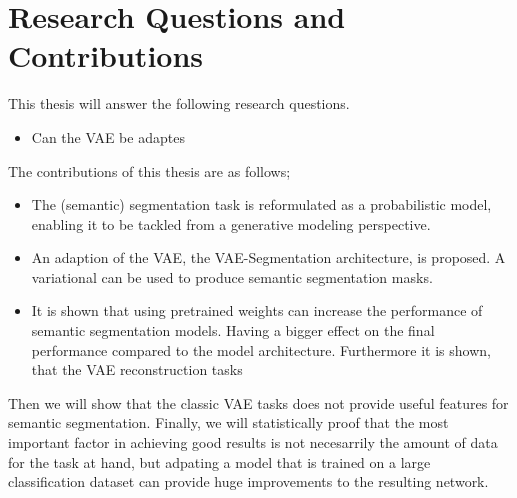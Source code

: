 \section{Research Questions and Contributions}
This thesis will answer the following research questions.
\begin{itemize}
    \item Can the VAE be adaptes
\end{itemize}
The contributions of this thesis are as follows;
\begin{itemize}
    \item The (semantic) segmentation task is reformulated as a probabilistic model, enabling it to be tackled from a generative modeling perspective.
    \item An adaption of the VAE, the VAE-Segmentation architecture, is proposed. A variational  can be used to produce semantic segmentation masks.
    \item It is shown that using pretrained weights can increase the performance of semantic segmentation models. Having a bigger effect on the final performance compared to the model architecture. Furthermore it is shown, that the VAE reconstruction tasks 
\end{itemize}
Then we will show that the classic VAE tasks does not provide useful features for semantic segmentation. Finally, we will statistically proof that the most important factor in achieving good results is not necesarrily the amount of data for the task at hand, but adpating a model that is trained on a large classification dataset can provide huge improvements to the resulting network.
